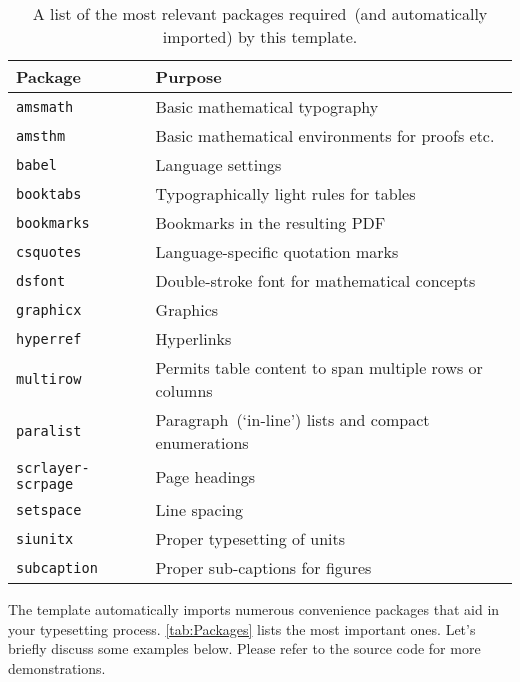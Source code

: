\begin{table}
  \centering
  \begin{tabular}{ll}
    \toprule
    \textbf{Package}      & \textbf{Purpose}\\
    \midrule
      \texttt{amsmath}          & Basic mathematical typography\\
      \texttt{amsthm}           & Basic mathematical environments for proofs etc.\\
      \texttt{babel}            & Language settings\\
      \texttt{booktabs}         & Typographically light rules for tables\\
      \texttt{bookmarks}        & Bookmarks in the resulting PDF\\
      \texttt{csquotes}         & Language-specific quotation marks\\
      \texttt{dsfont}           & Double-stroke font for mathematical concepts\\
      \texttt{graphicx}         & Graphics\\
      \texttt{hyperref}         & Hyperlinks\\
      \texttt{multirow}         & Permits table content to span multiple rows or columns\\ 
      \texttt{paralist}         & Paragraph~(`in-line') lists and compact enumerations\\
      \texttt{scrlayer-scrpage} & Page headings\\
      \texttt{setspace}         & Line spacing\\
      \texttt{siunitx}          & Proper typesetting of units\\
      \texttt{subcaption} & Proper sub-captions for figures\\
    \bottomrule
  \end{tabular}
  \caption{%
    A list of the most relevant packages required~(and automatically imported) by this template.
  }
  \label{tab:Packages}
\end{table}

The template automatically imports numerous convenience packages that
aid in your typesetting process. \autoref{tab:Packages} lists the
most important ones. Let's briefly discuss some examples below. Please
refer to the source code for more demonstrations.

